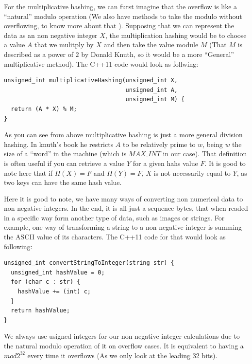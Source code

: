 For the multiplicative hashing, we can furst imagine that the overflow is like a ``natural'' modulo operation (We also have methods to take the modulo without overflowing, to know more about that ). Supposing that we can represent the data as an non negative integer \( X \), the multiplication hashing would be to choose a value \( A \) that we mulitply by \( X \) and then take the value module \( M \) (That \( M \) is described as a power of \( 2 \) by Donald Knuth, so it would be a more ``General'' multiplicative method). The C++11 code would look as follwing:

\medskip

\begin{lstlisting}
unsigned_int multiplicativeHashing(unsigned_int X,
                                   unsigned_int A,
                                   unsigned_int M) {
  return (A * X) % M; 
}
\end{lstlisting}

As you can see from above multiplicative hashing is just a more general division hashing. In knuth's book he restricts \( A \) to be relatively prime to \( w \), being \( w \) the size of a ``word'' in the machine (which is \( MAX\_INT \) in our case). That definition is often useful if you can retrieve a value \( Y \) for a given hahs value \( F \). It is good to note here that if \( H(X) = F \) and \( H(Y) = F \), \( X \) is not necessarily equal to \( Y \), as two keys can have the same hash value.

Here it is good to note, we have many ways of converting non numerical data to non negative integers. In the end, it is all just a sequence bytes, that when readed in a specific way form another type of data, such as images or strings. For example, one way of transforming a string to a non negative integer is summing the ASCII value of its characters. The C++11 code for that would look as following:

\begin{lstlisting}
unsigned_int convertStringToInteger(string str) {
  unsigned_int hashValue = 0;
  for (char c : str) {
    hashValue += (int) c;
  }
  return hashValue;
}
\end{lstlisting}

We always use usigned integers for our non negative integer calculations due to the natural modulo operation of it on overflow cases. It is equivalent to having a \( mod 2^{32} \) every time it overflows (As we only look at the leading 32 bits).